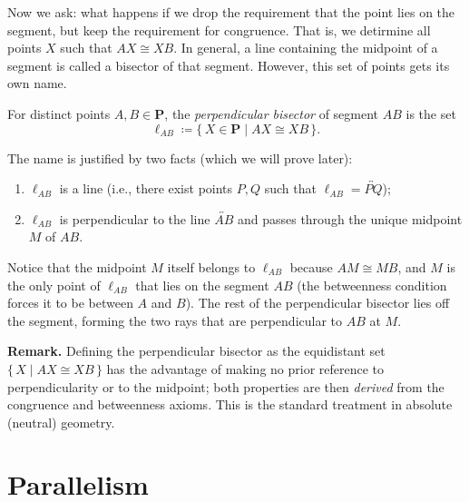 \documentclass[../../../main/main.tex]{subfiles}
\begin{document}
Now we ask: what happens if we drop the requirement that the point lies on the segment, but keep the requirement for congruence. That is, we detirmine all points $X$ such that $AX \cong XB$. In general, a line containing the midpoint of a segment is called a bisector of that segment. However, this set of points gets its own name.

\begin{definition}
  For distinct points $A,B\in\mathbf{P}$, the \textit{perpendicular bisector} of segment $AB$ is the set
  \[
  \ell_{AB} \coloneqq \{\, X\in\mathbf{P} \mid AX \cong XB\, \}.
  \]
\end{definition}

The name is justified by two facts (which we will prove later):
\begin{enumerate}
  \item $\ell_{AB}$ is a line (i.e., there exist points $P,Q$ such that $\ell_{AB} = \overleftrightarrow{PQ}$);
  \item $\ell_{AB}$ is perpendicular to the line $\overleftrightarrow{AB}$ and passes through the unique midpoint $M$ of $AB$.
\end{enumerate}
Notice that the midpoint $M$ itself belongs to $\ell_{AB}$ because $AM \cong MB$, and $M$ is the only point of $\ell_{AB}$ that lies on the segment $AB$ (the betweenness condition forces it to be between $A$ and $B$).  The rest of the perpendicular bisector lies off the segment, forming the two rays that are perpendicular to $AB$ at $M$.

\textbf{Remark.}  Defining the perpendicular bisector as the equidistant set $\{\,X \mid AX \cong XB\,\}$ has the advantage of making no prior reference to perpendicularity or to the midpoint; both properties are then \emph{derived} from the congruence and betweenness axioms.  This is the standard treatment in absolute (neutral) geometry.


\section{Parallelism}
\end{document}
